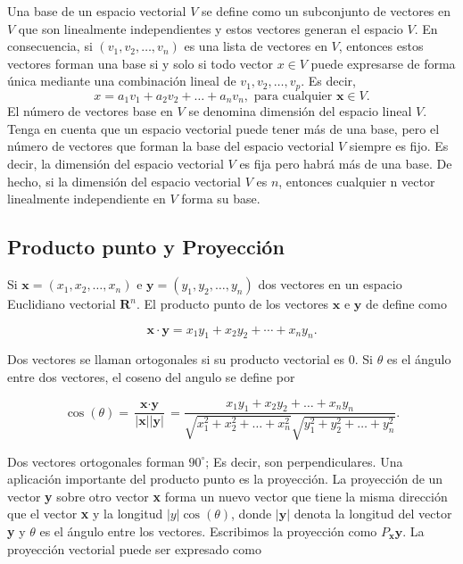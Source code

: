 Una base de un espacio vectorial $V$ se define como un subconjunto de vectores en $V$ que son linealmente independientes y estos vectores generan el espacio $V$. En consecuencia, si $(v_1 , v_2 , \ldots , v_n)$ es una lista de vectores en $V$, entonces estos vectores forman una base si y solo si todo vector $x \in V$ puede expresarse de forma única mediante una combinación lineal de $v_1 , v_2 , \ldots , v_p$. Es decir, 
$$x = a_1 v_1 + a_2 v_2 + \ldots + a_n v_n,\mbox{ para cualquier } \textbf{x}\in V.$$ 
El número de vectores base en $V$ se denomina dimensión del espacio lineal $V$. Tenga en cuenta que un espacio vectorial puede tener más de una base, pero el número de vectores que forman la base del espacio vectorial $V$ siempre es fijo. Es decir, la dimensión del espacio vectorial $V$ es fija pero habrá más de una base. De hecho, si la dimensión del espacio vectorial $V$ es $n$, entonces cualquier n vector linealmente independiente en $V$ forma su base.


\subsection{Producto punto y Proyección}

Si $\textbf{x}=(x_1,x_2,\ldots,x_n)$ e $\textbf{y}=(y_1,y_2,\ldots, y_n)$ dos vectores en un espacio Euclidiano vectorial $\textbf{R}^n$. El producto punto de los vectores $\textbf{x}$ e $\textbf{y}$ de define como

$$\textbf{x}\cdot \textbf{y} = x_1y_1+x_2y_2+\cdots + x_ny_n.$$

Dos vectores se llaman ortogonales si su  producto vectorial es $0$. Si $\theta$ es el ángulo entre dos vectores, el coseno del angulo se define por

\begin{tcolorbox}
    \begin{equation}
	\cos(\theta)=\dfrac{\textbf{x}\cdot \textbf{y}}{|\textbf{x}||\textbf{y}|}=\dfrac{x_1y_1+x_2y_2+\ldots  +x_ny_n}{\sqrt{x_1^2+x_2^2+\ldots + x_n^2}\sqrt{y_1^2+y_2^2+\ldots + y_n^2}}.
    \end{equation}
\end{tcolorbox}

Dos vectores ortogonales forman $90^\circ$; Es decir, son perpendiculares. Una aplicación importante del producto punto es la proyección. La proyección de un vector \textbf{y} sobre otro vector \textbf{x} forma un nuevo vector que tiene la misma dirección que el vector \textbf{x} y la longitud $|y|\cos(\theta)$, donde $|\textbf{y}|$ denota la longitud del vector \textbf{y} y $\theta$ es el ángulo entre los vectores. Escribimos la proyección como $P_{\textbf{x}}\textbf{y}$. La proyección vectorial puede ser expresado como

